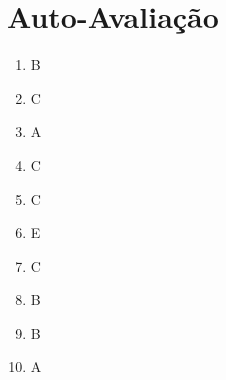 \documentclass[12pt]{article}
\begin{document}
	
	\newpage 
	\section*{Auto-Avaliação}
	
	\begin{enumerate}
		\item B
		\item C
		\item A
		\item C
		\item C
		\item E
		\item C
		\item B
		\item B
		\item A
	\end{enumerate}
	
	
\end{document}

